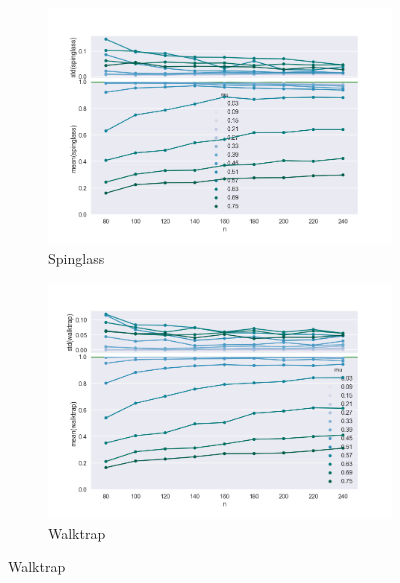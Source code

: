 \begin{figure}
    \begin{subfigure}[b]{0.32\textwidth}
        \includegraphics[width=\textwidth]{fig/nmi_vs_n_spinglass}
        \caption{Spinglass}
        \label{fig:gull}
    \end{subfigure}
    \qquad
    \begin{subfigure}[b]{0.32\textwidth}
        \includegraphics[width=\textwidth]{fig/nmi_vs_n_walktrap}
        \caption{Walktrap}
        \label{fig:tiger}
    \end{subfigure}


\end{figure}
